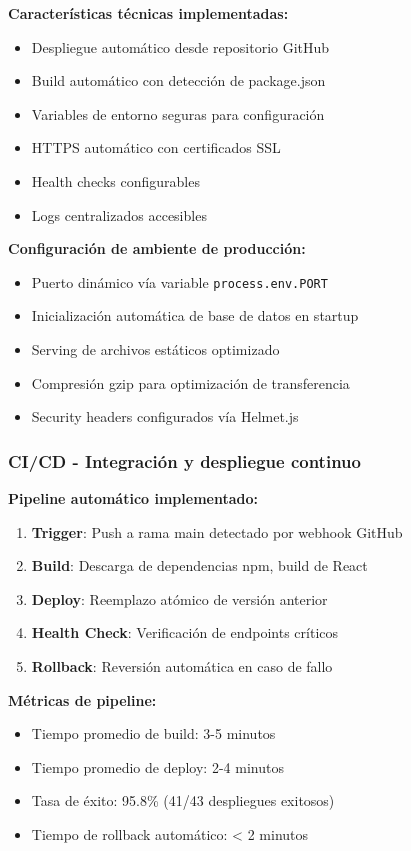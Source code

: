 \textbf{Características técnicas implementadas:}
\begin{itemize}
    \item Despliegue automático desde repositorio GitHub
    \item Build automático con detección de package.json
    \item Variables de entorno seguras para configuración
    \item HTTPS automático con certificados SSL
    \item Health checks configurables
    \item Logs centralizados accesibles
\end{itemize}

\textbf{Configuración de ambiente de producción:}
\begin{itemize}
    \item Puerto dinámico vía variable \texttt{process.env.PORT}
    \item Inicialización automática de base de datos en startup
    \item Serving de archivos estáticos optimizado
    \item Compresión gzip para optimización de transferencia
    \item Security headers configurados vía Helmet.js
\end{itemize}

\subsubsection{CI/CD - Integración y despliegue continuo}

\textbf{Pipeline automático implementado:}
\begin{enumerate}
    \item \textbf{Trigger}: Push a rama main detectado por webhook GitHub
    \item \textbf{Build}: Descarga de dependencias npm, build de React
    \item \textbf{Deploy}: Reemplazo atómico de versión anterior
    \item \textbf{Health Check}: Verificación de endpoints críticos
    \item \textbf{Rollback}: Reversión automática en caso de fallo
\end{enumerate}

\textbf{Métricas de pipeline:}
\begin{itemize}
    \item Tiempo promedio de build: 3-5 minutos
    \item Tiempo promedio de deploy: 2-4 minutos
    \item Tasa de éxito: 95.8\% (41/43 despliegues exitosos)
    \item Tiempo de rollback automático: < 2 minutos
\end{itemize}

